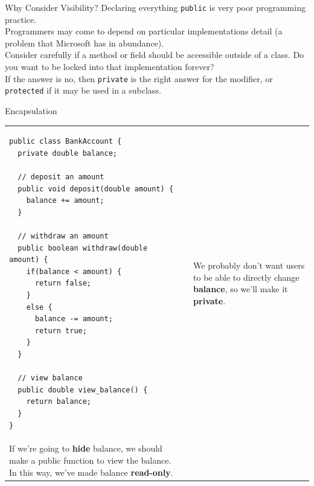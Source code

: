 \documentclass[aspectratio=169]{beamer}
\begin{document}
\begin{frame}{Why Consider Visibility?}
Declaring everything \texttt{public} is very poor programming practice. \\
\vspace{1em}
Programmers may come to depend on particular implementations detail (a problem that Microsoft has in abundance). \\
\vspace{1em}
Consider carefully if a method or field should be accessible outside of a class. Do you want to be locked into that implementation forever? \\
\vspace{1em}
If the answer is no, then \texttt{private} is the right answer for the modifier, or \texttt{protected} if it may be used in a subclass. \\
\end{frame}


\begin{frame}[fragile]{Encapsulation}

\centering
\begin{tabular}{@{}m{} | m{}@{} m{}@{}}

\begin{Verbatim}[fontsize=\tiny]
public class BankAccount {
  private double balance;
  
  // deposit an amount
  public void deposit(double amount) {
    balance += amount;
  }
  
  // withdraw an amount
  public boolean withdraw(double amount) {
    if(balance < amount) {
      return false;
    }
    else {
      balance -= amount;
      return true;
    }
  }
  
  // view balance
  public double view_balance() {
    return balance;  
  }
}
\end{Verbatim}

&&

\raggedright
We probably don't want users to be able to directly change \textbf{balance}, so we'll make it \textbf{private}. \\
\vspace{2em}
If we're going to \textbf{hide} balance, we should make a public function to view the balance. In this way, we've made balance \textbf{read-only}. \\
\end{tabular}

\end{frame}
\end{document}
